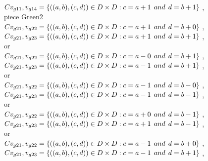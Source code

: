\\$C{v_{g11},v_{g14}}=\{((a,b),(c,d))\in D\times D: c = a + 1\hspace{1ex} and \hspace{1ex}  d = b + 1 \}$ , 
\\ piece Green2 
\\$C{v_{g21},v_{g22}}=\{((a,b),(c,d))\in D\times D: c = a + 1\hspace{1ex} and \hspace{1ex}  d = b + 0 \}$ , 
\\$C{v_{g21},v_{g23}}=\{((a,b),(c,d))\in D\times D: c = a + 1\hspace{1ex} and \hspace{1ex}  d = b + 1 \}$ , 
\\or
\\$C{v_{g21},v_{g22}}=\{((a,b),(c,d))\in D\times D: c = a - 0\hspace{1ex} and \hspace{1ex}  d = b + 1 \}$ , 
\\$C{v_{g21},v_{g23}}=\{((a,b),(c,d))\in D\times D: c = a - 1\hspace{1ex} and \hspace{1ex}  d = b + 1 \}$ , 
\\or
\\$C{v_{g21},v_{g22}}=\{((a,b),(c,d))\in D\times D: c = a - 1\hspace{1ex} and \hspace{1ex}  d = b - 0 \}$ , 
\\$C{v_{g21},v_{g23}}=\{((a,b),(c,d))\in D\times D: c = a - 1\hspace{1ex} and \hspace{1ex}  d = b - 1 \}$ , 
\\or
\\$C{v_{g21},v_{g22}}=\{((a,b),(c,d))\in D\times D: c = a + 0\hspace{1ex} and \hspace{1ex}  d = b - 1 \}$ , 
\\$C{v_{g21},v_{g23}}=\{((a,b),(c,d))\in D\times D: c = a + 1\hspace{1ex} and \hspace{1ex}  d = b - 1 \}$ , 
\\or
\\$C{v_{g21},v_{g22}}=\{((a,b),(c,d))\in D\times D: c = a - 1\hspace{1ex} and \hspace{1ex}  d = b + 0 \}$ , 
\\$C{v_{g21},v_{g23}}=\{((a,b),(c,d))\in D\times D: c = a - 1\hspace{1ex} and \hspace{1ex}  d = b + 1 \}$ , 
